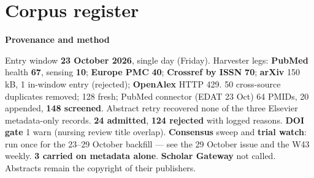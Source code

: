 \documentclass[10pt]{article}
\begin{document}
\clearpage
\section*{\sffamily\bfseries\color{Deep}Corpus register}
\vspace{-1.5mm}{\color{Amber}\rule{\linewidth}{1.1pt}}\vspace{2.5mm}



\vspace{2mm}

\begin{keybox}
{\sffamily\bfseries\footnotesize\color{Deep}Provenance and method}\\[1.2mm]
{\fontsize{7.2}{8.8}\selectfont
Entry window \textbf{23 October 2026}, single day (Friday). Harvester legs: \textbf{PubMed} health
\textbf{67}, sensing \textbf{10}; \textbf{Europe PMC} \textbf{40}; \textbf{Crossref by ISSN} \textbf{70};
\textbf{arXiv} 150 kB, 1 in-window entry (rejected); \textbf{OpenAlex} HTTP 429. 50 cross-source duplicates removed;
128 fresh; PubMed connector (EDAT 23 Oct) 64 PMIDs, 20 appended, \textbf{148 screened}. Abstract retry recovered none
of the three Elsevier metadata-only records. \textbf{24 admitted}, \textbf{124 rejected} with logged reasons.
\textbf{DOI gate} 1 warn (nursing review title overlap). \textbf{Consensus} sweep and \textbf{trial watch}: run once for
the 23--29 October backfill --- see the 29 October issue and the W43 weekly. \textbf{3 carried on metadata alone}.
\textbf{Scholar Gateway} not called. Abstracts remain the copyright of their publishers.\par}
\end{keybox}
\end{document}
